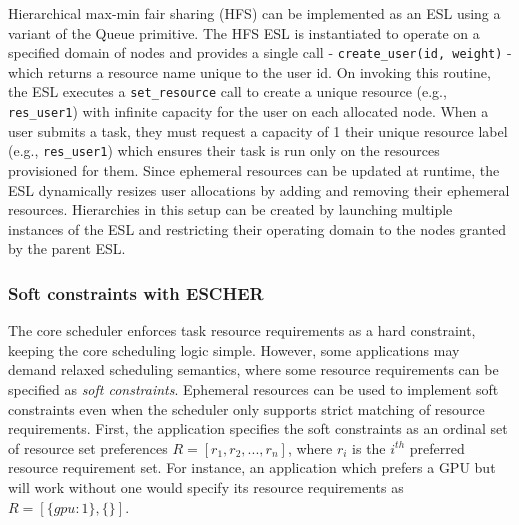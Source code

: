 Hierarchical max-min fair sharing (HFS) can be implemented as an ESL using a variant of the Queue primitive. The HFS ESL is instantiated to operate on a specified domain of nodes and provides a single call - \lstinline{create_user(id, weight)} - which returns a resource name unique to the user id. On invoking this routine, the ESL executes a \lstinline{set_resource} call to create a unique resource (e.g., \lstinline{res_user1}) with infinite capacity for the user on each allocated node. When a user submits a task, they must request a capacity of 1 their unique resource label (e.g., \lstinline{res_user1}) which ensures their task is run only on the resources provisioned for them.  Since ephemeral resources can be updated at runtime, the ESL dynamically resizes user allocations by adding and removing their ephemeral resources. Hierarchies in this setup can be created by launching multiple instances of the ESL  and restricting their operating domain to the nodes granted by the parent ESL.


\subsubsection{Soft constraints with ESCHER}
\label{sec:softconstraints}
The core scheduler enforces task resource requirements as a hard constraint, keeping the core scheduling logic simple. %
However, some applications may demand relaxed scheduling semantics, where some resource requirements can be specified as \textit{soft constraints}.
Ephemeral resources can be used to implement soft constraints even when the scheduler only supports strict matching of resource requirements.
First, the application specifies the soft constraints as an ordinal set of resource set preferences $R = [r_1, r_2, ..., r_n]$, where $r_i$ is the $i^{th}$ preferred resource requirement set.
For instance, an application which prefers a GPU but will work without one would specify its resource requirements as $R = [\{gpu: 1\}, \{\} ]$.

